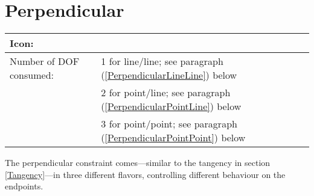 \documentclass[12pt,titlepage]{article}
\newcommand{\icon}[1]{\raisebox{-1em}{\rule{0pt}{27pt}\texttt{[image: images/\#1]}}}
\newcommand{\dofConsumed}{Number of DOF consumed:}
\begin{document}
\section{Perpendicular} \begin{tabular}{|l|l|} \hline Icon: & \icon{Constraint_Perpendicular}\\ \hline \dofConsumed & 1 for line/line; see paragraph (\ref{PerpendicularLineLine}) below \\ & 2 for point/line; see paragraph (\ref{PerpendicularPointLine}) below \\ & 3 for point/point; see paragraph (\ref{PerpendicularPointPoint}) below \\ \hline \end{tabular}

The perpendicular constraint comes---similar to the tangency in section \vref{Tangency}---in three different flavors, controlling different behaviour on the endpoints.
\end{document}
